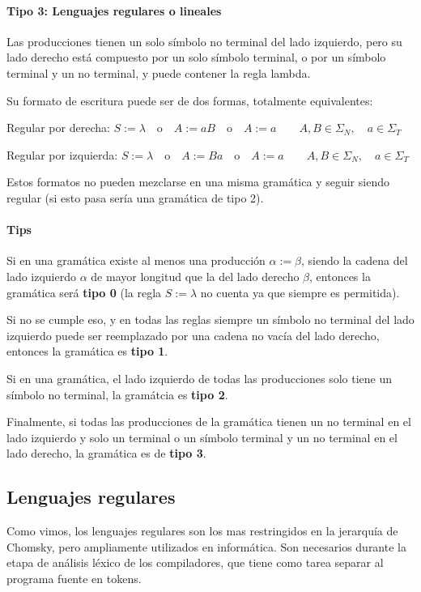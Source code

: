 \documentclass[12pt]{article}
\begin{document}
\paragraph{Tipo 3: Lenguajes regulares o lineales}\mbox{}

Las producciones tienen un solo símbolo no terminal del lado izquierdo, pero su lado derecho está compuesto por un solo símbolo terminal, o por un símbolo terminal y un no terminal, y puede contener la regla lambda.

Su formato de escritura puede ser de dos formas, totalmente equivalentes:

Regular por derecha: $ S:=\lambda \quad \text{o} \quad A:=aB \quad \text{o} \quad A:=a \qquad A,B \in \Sigma_{N}, \quad a \in \Sigma_{T} $

Regular por izquierda: $ S:=\lambda \quad \text{o} \quad A:=Ba \quad \text{o} \quad A:=a \qquad A,B \in \Sigma_{N}, \quad a \in \Sigma_{T} $

Estos formatos no pueden mezclarse en una misma gramática y seguir siendo regular (si esto pasa sería una gramática de tipo 2).

\paragraph{Tips}\mbox{}

Si en una gramática existe al menos una producción $ \alpha:=\beta $, siendo la cadena del lado izquierdo $ \alpha $ de mayor longitud que la del lado derecho $ \beta $, entonces la gramática será \textbf{tipo 0} (la regla $ S:=\lambda $ no cuenta ya que siempre es permitida). 

Si no se cumple eso, y en todas las reglas siempre un símbolo no terminal del lado izquierdo puede ser reemplazado por una cadena no vacía del lado derecho, entonces la gramática es \textbf{tipo 1}.

Si en una gramática, el lado izquierdo de todas las producciones solo tiene un símbolo no terminal, la gramátcia es \textbf{tipo 2}.

Finalmente, si todas las producciones de la gramática tienen un no terminal en el lado izquierdo y solo un terminal o un símbolo terminal y un no terminal en el lado derecho, la gramática es de \textbf{tipo 3}.

\subsection{Lenguajes regulares}
Como vimos, los lenguajes regulares son los mas restringidos en la jerarquía de Chomsky, pero ampliamente utilizados en informática. Son necesarios durante la etapa de análisis léxico de los compiladores, que tiene como tarea separar al programa fuente en tokens.
\end{document}
